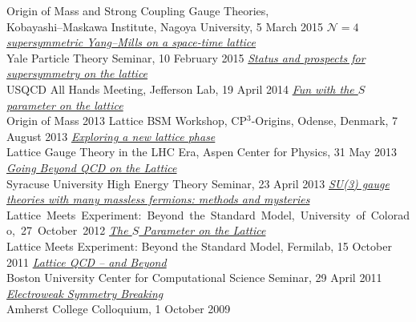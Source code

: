 \begin{spacelist}
\begin{revnumerate}
      Origin of Mass and Strong Coupling Gauge Theories, \\ Kobayashi--Maskawa Institute, Nagoya University, 5 March 2015
    \pagebreakitem
      \textit{\href{http://www.davidschaich.net/talks/Yale1502.pdf}{$\mathcal N = 4$ supersymmetric Yang--Mills on a space-time lattice}} \\
      Yale Particle Theory Seminar, 10 February 2015
    \pagebreakitem
      \textit{\href{http://www.davidschaich.net/talks/USQCD14.pdf}{Status and prospects for supersymmetry on the lattice}} \\
      USQCD All Hands Meeting, Jefferson Lab, 19 April 2014
    \pagebreakitem
      \textit{\href{http://www.davidschaich.net/talks/Mass13.pdf}{Fun with the $S$ parameter on the lattice}} \\
      Origin of Mass 2013 Lattice BSM Workshop, CP$^3$-Origins, Odense, Denmark, 7 August 2013
    \pagebreakitem
      \textit{\href{http://www.davidschaich.net/talks/Aspen13.pdf}{Exploring a new lattice phase}} \\
      Lattice Gauge Theory in the LHC Era, Aspen Center for Physics, 31 May 2013
    \pagebreakitem
      \textit{\href{http://www.davidschaich.net/talks/SU1304.pdf}{Going Beyond QCD on the Lattice}} \\
      Syracuse University High Energy Theory Seminar, 23 April 2013
    \pagebreakitem
      \textit{\href{http://www.davidschaich.net/talks/LME2012.pdf}{SU(3) gauge theories with many massless fermions: methods and mysteries}} \\
      Lattice~Meets~Experiment:~Beyond~the~Standard~Model,~University~of~Colorado,~27~October~2012
    \pagebreakitem
      \textit{\href{http://www.davidschaich.net/talks/LME2011.pdf}{The $S$ Parameter on the Lattice}} \\
      Lattice Meets Experiment: Beyond the Standard Model, Fermilab, 15 October 2011
    \pagebreakitem
      \textit{\href{http://www.davidschaich.net/talks/1104CCS.pdf}{Lattice QCD -- and Beyond}} \\
      Boston University Center for Computational Science Seminar, 29 April 2011
    \pagebreakitem
      \textit{\href{http://www.davidschaich.net/talks/EWSB.pdf}{Electroweak Symmetry Breaking}} \\
      Amherst College Colloquium, 1 October 2009 \\

\end{revnumerate}
\end{spacelist}
